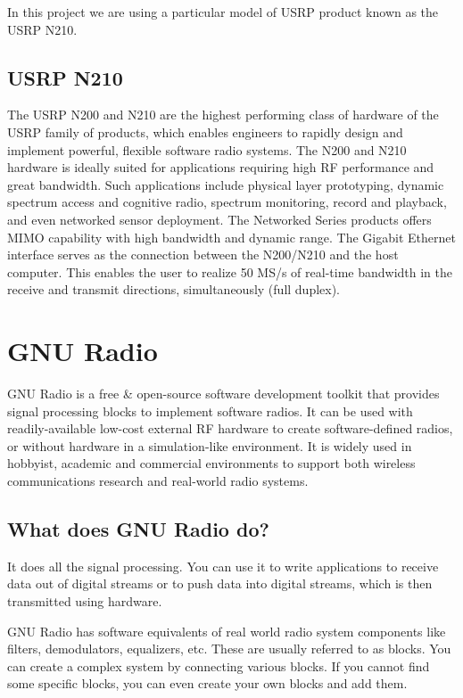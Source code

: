 In this project we are using a particular model of USRP product known as the
USRP N210.

\subsection{USRP N210}

The USRP N200 and N210 are the highest performing class of hardware of the 
USRP family of products, which enables engineers to rapidly design and 
implement powerful, flexible software radio systems. The N200 and N210 
hardware is ideally suited for applications requiring high RF performance and
great bandwidth. Such applications include physical layer prototyping, dynamic
spectrum access and cognitive radio, spectrum monitoring, record and playback,
and even networked sensor deployment. The Networked Series products offers 
MIMO capability with high bandwidth and dynamic range. The Gigabit Ethernet
interface serves as the connection between the N200/N210 and the host 
computer. This enables the user to realize 50 MS/s of real-time bandwidth in 
the receive and transmit directions, simultaneously (full duplex).


\section{GNU Radio}

GNU Radio is a free \& open-source software development toolkit that provides 
signal processing blocks to implement software radios. It can be used with 
readily-available low-cost external RF hardware to create software-defined 
radios, or without hardware in a simulation-like environment. It is widely 
used in hobbyist, academic and commercial environments to support both 
wireless communications research and real-world radio systems.

\subsection{What does GNU Radio do?}
It does all the signal processing. You can use it to write applications to 
receive data out of digital streams or to push data into digital streams, 
which is then transmitted using hardware.

GNU Radio has software equivalents of real world radio system components like 
filters, demodulators, equalizers, etc. These are usually referred to as
blocks. You can create a complex system by connecting various blocks. If you
cannot find some specific blocks, you can even create your own blocks and add
them.

